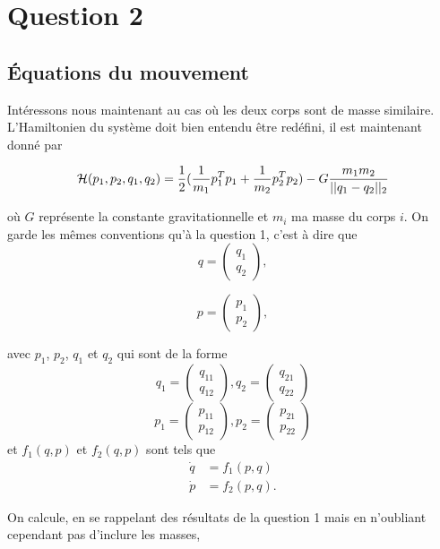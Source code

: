 \section*{Question 2}
\subsection{Équations du mouvement}
Intéressons nous maintenant au cas où les deux corps sont de masse similaire. L'Hamiltonien du système doit bien entendu être redéfini, il est maintenant donné par 

$$\mathcal{H}(p_1,p_2,q_1,q_2) = \frac{1}{2} (\frac{1}{m_1} p_1^T p_1 + \frac{1}{m_2} p_2^T p_2) - G \frac{m_1 m_2}{||q_1- q_2||_2} $$

où $G$ représente la constante gravitationnelle et $m_i$ ma masse du corps $i$. On garde les mêmes conventions qu'à la question 1, c'est à dire que 
 $$q =
\begin{pmatrix}
  q_1\\
  q_2
\end{pmatrix},$$

$$p =
\begin{pmatrix}
  p_1\\
  p_2
\end{pmatrix},$$

avec $p_1$, $p_2$, $q_1$ et $q_2$ qui sont de la forme 
$$q_1 =
\begin{pmatrix}
  q_{11}\\
  q_{12}
\end{pmatrix},
q_2 =
\begin{pmatrix}
  q_{21}\\
  q_{22}
\end{pmatrix}$$
$$p_1 =
\begin{pmatrix}
  p_{11}\\
  p_{12}
\end{pmatrix},
p_2 =
\begin{pmatrix}
  p_{21}\\
  p_{22}
\end{pmatrix}
$$
 et
$f_1(q,p)$ et $f_2(q,p)$ sont tels que
\begin{align*}
  \dot{q} & = f_1(p,q)\\
  \dot{p} & = f_2(p,q).
\end{align*}

On calcule, en se rappelant des résultats de la question 1 mais en n'oubliant cependant pas d'inclure les masses, 
 
